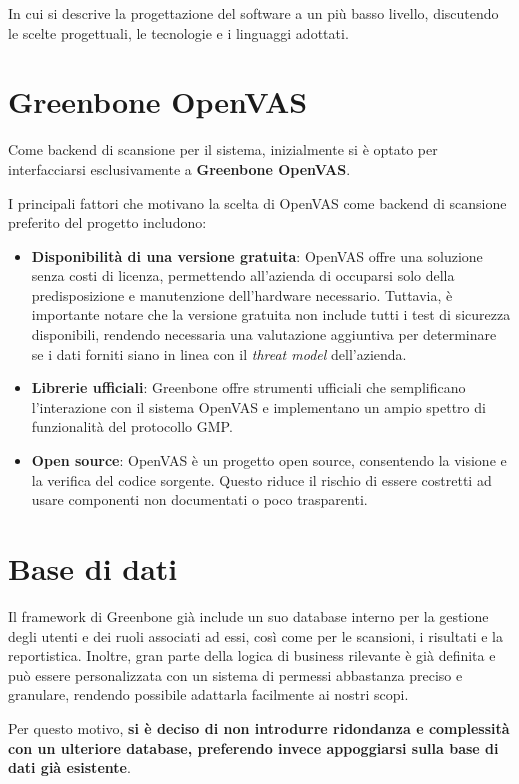 In cui si descrive la progettazione del software a un più basso livello, discutendo le scelte progettuali, le tecnologie e i linguaggi adottati.

\section{Greenbone OpenVAS}
Come backend di scansione per il sistema, inizialmente si è optato per interfacciarsi esclusivamente a \textbf{Greenbone OpenVAS}.

I principali fattori che motivano la scelta di OpenVAS come backend di scansione preferito del progetto includono:

\begin{itemize}
    \item \textbf{Disponibilità di una versione gratuita}: OpenVAS offre una soluzione senza costi di licenza, permettendo all'azienda di occuparsi solo della predisposizione e manutenzione dell'hardware necessario. Tuttavia, è importante notare che la versione gratuita non include tutti i test di sicurezza disponibili, rendendo necessaria una valutazione aggiuntiva per determinare se i dati forniti siano in linea con il \emph{threat model} dell'azienda.

    \item \textbf{Librerie ufficiali}: Greenbone offre strumenti ufficiali che semplificano l'interazione con il sistema OpenVAS e implementano un ampio spettro di funzionalità del protocollo GMP.
    
    \item \textbf{Open source}: OpenVAS è un progetto open source, consentendo la visione e la verifica del codice sorgente. Questo riduce il rischio di essere costretti ad usare componenti non documentati o poco trasparenti.
\end{itemize}

\section{Base di dati}
Il framework di Greenbone già include un suo database interno per la gestione degli utenti e dei ruoli associati ad essi, così come per le scansioni, i risultati e la reportistica. Inoltre, gran parte della logica di business rilevante è già definita e può essere personalizzata con un sistema di permessi abbastanza preciso e granulare, rendendo possibile adattarla facilmente ai nostri scopi.

Per questo motivo, \textbf{si è deciso di non introdurre ridondanza e complessità con un ulteriore database, preferendo invece appoggiarsi sulla base di dati già esistente}.

